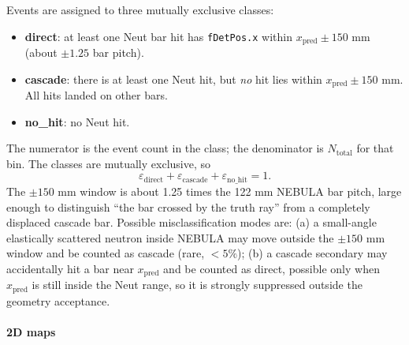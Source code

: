 \documentclass[a4paper,11pt]{article}
\begin{document}
Events are assigned to three mutually exclusive classes:
\begin{itemize}[itemsep=-2pt]
    \item \textbf{direct}: at least one Neut bar hit has \texttt{fDetPos.x}
          within $x_\mathrm{pred}\pm 150$ mm (about $\pm 1.25$ bar pitch).
    \item \textbf{cascade}: there is at least one Neut hit, but \emph{no} hit
          lies within $x_\mathrm{pred}\pm 150$ mm. All hits landed on other
          bars.
    \item \textbf{no\_hit}: no Neut hit.
\end{itemize}
The numerator is the event count in the class; the denominator is
$N_\mathrm{total}$ for that bin. The classes are mutually exclusive, so
\[
\varepsilon_\mathrm{direct} +
\varepsilon_\mathrm{cascade} +
\varepsilon_\mathrm{no\_hit} = 1.
\]
The $\pm 150$ mm window is about 1.25 times the 122 mm NEBULA bar pitch, large
enough to distinguish ``the bar crossed by the truth ray'' from a completely
displaced cascade bar. Possible misclassification modes are: (a) a small-angle
elastically scattered neutron inside NEBULA may move outside the $\pm 150$ mm
window and be counted as cascade (rare, $<5\%$); (b) a cascade secondary may
accidentally hit a bar near $x_\mathrm{pred}$ and be counted as direct, possible
only when $x_\mathrm{pred}$ is still inside the Neut range, so it is strongly
suppressed outside the geometry acceptance.

\paragraph{2D maps}
\end{document}
